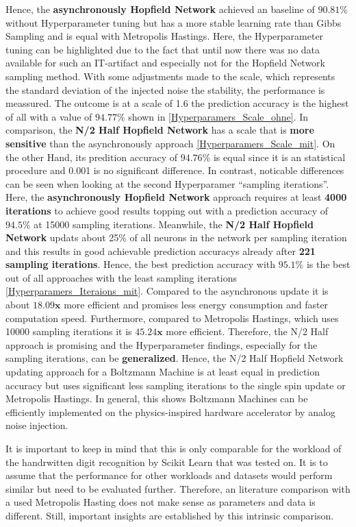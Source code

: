 Hence, the \textbf{asynchronously Hopfield Network} achieved an baseline of \(\mathbf{90.81\%}\) without Hyperparameter tuning but has a more stable  learning rate than Gibbs Sampling and
is equal with Metropolis Hastings.
Here, the Hyperparameter tuning can be highlighted due to the fact that until now there was no data available for such an \ac{IT}-artifact and especially not for the Hopfield Network sampling method.
With some adjustments made to the scale, which represents the standard deviation of the injected noise the stability, the performance is meassured.
The outcome is at a scale of 1.6 the prediction accuracy is the highest of all with a value of \(\mathbf{94.77\%}\) shown in \ref{Hyperparamers_Scale_ohne}.
In comparison, the \textbf{N/2 Half Hopfield Network} has a scale that is \textbf{more sensitive} than the asynchronously approach \ref{Hyperparamers_Scale_mit}.
On the other Hand, its predition accuracy of \(\mathbf{94.76\%}\) is equal since it is an statistical procedure and 0.001 is no significant difference.
In contrast, noticable differences can be seen when looking at the second Hyperparamer ``sampling iterations''. 
Here, the \textbf{asynchronously Hopfield Network} approach requires at least \textbf{4000 iterations} to achieve good results topping out with
a prediction accuracy of \(\mathbf{94.5\%}\) at 15000 sampling iterations. 
Meanwhile, the \textbf{N/2 Half Hopfield Network} updats about 25\% of all neurons in the network per sampling iteration and 
this results in good achievable prediction accuracys already after \textbf{221 sampling iterations}.
Hence, the best prediction accuracy with \(\mathbf{95.1\%}\) is the best out of all approaches with the least sampling iterations \ref{Hyperparamers_Iteraions_mit}.
Compared to the asynchronous update it is about \(\mathbf{18.09x}\) more efficient and promises less energy consumption and faster computation speed. 
Furthermore, compared to Metropolis Hastings, which uses 10000 sampling iterations it is \(\mathbf{45.24x}\) more efficient.
Therefore, the N/2 Half approach is promising and the Hyperparameter findings, especially for the sampling iterations, can be \textbf{generalized}.
Hence, the N/2 Half Hopfield Network updating approach for a Boltzmann Machine is at least equal in prediction accuracy but uses significant less sampling iterations to the single spin update or Metropolis Hastings.
In general, this shows Boltzmann Machines can be efficiently implemented on the physics-inspired hardware accelerator by analog noise injection. 

It is important to keep in mind that this is only comparable for the workload of the handrwitten digit recognition by Scikit Learn that was tested on. 
It is to assume that the performance for other workloads and datasets would perform similar but need to be evaluated further. 
Therefore, an literature comparison with a used Metropolis Hasting does not make sense as parameters and data is different. 
Still, important insights are established by this intrinsic comparison. 

